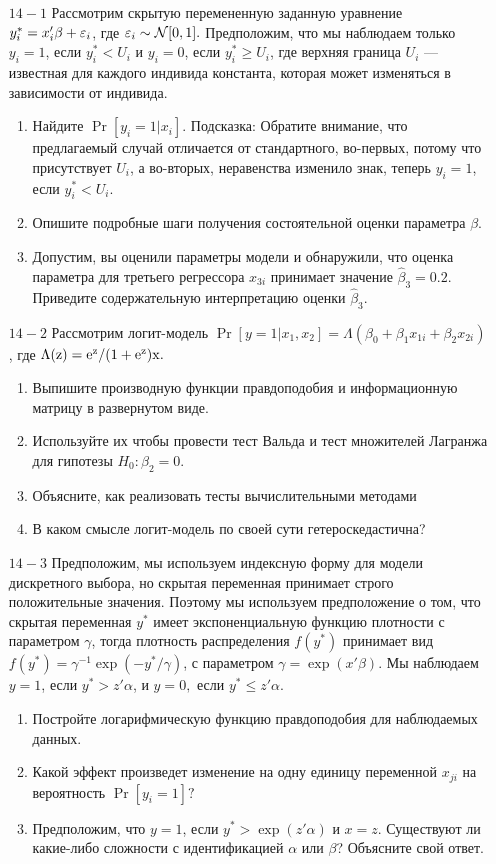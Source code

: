 \begin{enumerate}
\item [$14 - 1$] Рассмотрим скрытую перемененную заданную уравнение $y^*_i = x'_i\beta +\varepsilon_i$,  где $\varepsilon_i \sim \mathcal{N} [0, 1].$ Предположим, что мы наблюдаем только $y_i=1$, если $y^*_i < U_i$ и $y_i = 0$,  если $y^*_i\ge U_i$,  где верхняя граница $U_i$ --- известная для каждого индивида константа,  которая может изменяться в зависимости от индивида.
\begin{enumerate}
\item  Найдите $\Pr [y_i=1 | x_i]$. Подсказка: Обратите внимание,  что предлагаемый случай отличается от стандартного,  во-первых,  потому что присутствует $U_i$, а во-вторых,  неравенства изменило знак, теперь $y_i = 1$,  если $y^*_i < U_i$.
\item  Опишите подробные шаги получения состоятельной оценки параметра $\beta$.
\item  Допустим,  вы оценили параметры модели и обнаружили,  что оценка параметра для третьего регрессора $x_{3i}$ принимает значение $\widehat\beta_3 = 0.2.$ Приведите содержательную интерпретацию оценки $\widehat\beta_3.$
\end{enumerate}

\item [$14 - 2$] Рассмотрим логит-модель $\Pr[y=1|x_1, x_2] = \Lambda (\beta_0 + \beta_1 x_{1i} + \beta_2x_{2i})$, где $\Lambda (\rm{z}) = e^z/(1+e^z)x.$
\begin{enumerate}
\item  Выпишите производную функции правдоподобия и информационную матрицу в развернутом виде.
\item Используйте их чтобы провести тест Вальда и тест множителей Лагранжа для гипотезы $H_0: \beta_2 = 0$.
\item  Объясните, как реализовать тесты вычислительными методами
\item  В каком смысле логит-модель по своей сути гетероскедастична?
\end{enumerate}

\item [$14 - 3$] Предположим,  мы используем индексную форму для модели дискретного выбора,  но скрытая переменная принимает строго положительные значения. Поэтому мы используем предположение о том,  что скрытая переменная $y^*$ имеет экспоненциальную функцию плотности с параметром $\gamma $,  тогда плотность распределения $f(y^*)$ принимает вид $f(y^*) = \gamma^{-1} \exp (-y^*/\gamma)$,  с параметром $\gamma = \exp (x'\beta).$ Мы наблюдаем $y = 1$,  если $y^* > z'\alpha$,  и $y = 0,$ если $y^* \le z'\alpha$.
\begin{enumerate}
\item  Постройте логарифмическую функцию правдоподобия для наблюдаемых данных.
\item Какой эффект произведет изменение на одну единицу переменной $x_{ji}$ на вероятность $\Pr[y_i = 1]?$
\item  Предположим,  что $y = 1$,  если $y^* > \exp (z'\alpha)$ и $x = z.$ Существуют ли какие-либо сложности с идентификацией $\alpha$ или $\beta$? Объясните свой ответ.
\end{enumerate}


\end{enumerate}
